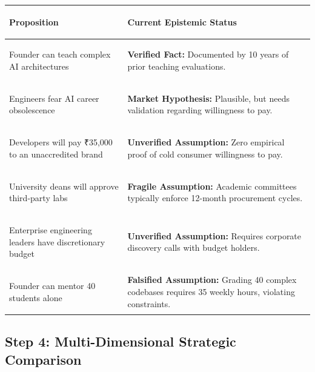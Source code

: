 \begin{tcolorbox}[
  enhanced,
  colback=BayesSurface!60,
  colframe=BayesBorder,
  boxrule=0.5pt,
  arc=3pt,
  left=3pt,right=3pt,top=3pt,bottom=3pt,
  boxsep=1pt
]
\scriptsize
\begin{tabularx}{\linewidth}{>{\bfseries\raggedright\arraybackslash}p{2.4cm} X}
\toprule
\textbf{Proposition} & \textbf{Current Epistemic Status} \\
\midrule
Founder can teach complex AI architectures & \textbf{Verified Fact:} Documented by 10 years of prior teaching evaluations. \\
\addlinespace[2pt]
Engineers fear AI career obsolescence & \textbf{Market Hypothesis:} Plausible, but needs validation regarding willingness to pay. \\
\addlinespace[2pt]
Developers will pay ₹35,000 to an unaccredited brand & \textbf{Unverified Assumption:} Zero empirical proof of cold consumer willingness to pay. \\
\addlinespace[2pt]
University deans will approve third-party labs & \textbf{Fragile Assumption:} Academic committees typically enforce 12-month procurement cycles. \\
\addlinespace[2pt]
Enterprise engineering leaders have discretionary budget & \textbf{Unverified Assumption:} Requires corporate discovery calls with budget holders. \\
\addlinespace[2pt]
Founder can mentor 40 students alone & \textbf{Falsified Assumption:} Grading 40 complex codebases requires 35 weekly hours, violating constraints. \\
\bottomrule
\end{tabularx}
\end{tcolorbox}

\subsection{Step 4: Multi-Dimensional Strategic Comparison}

